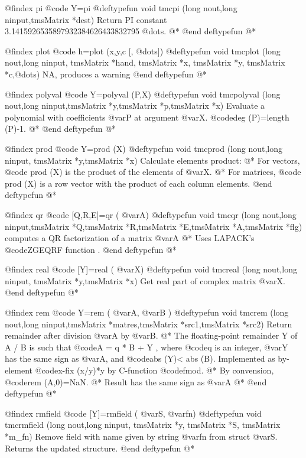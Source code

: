 @findex pi 
@code{   Y=pi    }
@deftypefun void tmcpi  (long nout,long ninput,tmsMatrix *dest)
Return PI constant 3.1415926535897932384626433832795 @dots{}. @*
@end deftypefun
@*


@findex  plot
@code{ h=plot (x,y,c [, @dots{}]) }
@deftypefun void tmcplot  (long nout,long ninput, tmsMatrix *hand, tmsMatrix *x, tmsMatrix *y, tmsMatrix *c,@dots{})
NA, produces a warning
@end deftypefun
@*


@findex polyval
@code{   Y=polyval (P,X)    }
@deftypefun void tmcpolyval (long nout,long ninput,tmsMatrix *y,tmsMatrix *p,tmsMatrix *x)
Evaluate a polynomial with coefficients @var{P} at argument @var{X}. @code{deg (P)=length (P)-1}. @*
@end deftypefun
@*



@findex prod
@code{   Y=prod (X)    }
@deftypefun void tmcprod (long nout,long ninput, tmsMatrix *y,tmsMatrix *x)
Calculate elements product: @*
For vectors, @code{ prod (X)} is the product of the elements of @var{X}. @*
For matrices, @code{ prod (X)} is a row vector with the product of each column elements.
@end deftypefun
@*


@findex   qr
@code{  [Q,R,E]=qr ( @var{A})}
@deftypefun void tmcqr  (long nout,long ninput,tmsMatrix *Q,tmsMatrix *R,tmsMatrix *E,tmsMatrix *A,tmsMatrix *flg)
computes a QR factorization of a    matrix     @var{A} @*
Uses LAPACK's @code{ZGEQRF}  function . 
@end deftypefun
@*


@findex  real
@code{  [Y]=real  ( @var{X})}
@deftypefun void tmcreal  (long nout,long ninput, tmsMatrix *y,tmsMatrix *x)
Get real part of complex matrix @var{X}. 
@end deftypefun
@*


@findex  rem
@code{ Y=rem  ( @var{A}, @var{B} ) }
@deftypefun void tmcrem (long nout,long ninput,tmsMatrix *matres,tmsMatrix *src1,tmsMatrix *src2)
Return remainder after division @var{A} by @var{B}. @*
The floating-point remainder Y of A / B is such that @code{A = q * B + Y} ,
where @code{q} is an integer, @var{Y} has the same sign as @var{A}, and   @code{abs (Y)< abs (B)}.
Implemented as by-element @code{x-fix (x/y)*y} by C-function @code{fmod}. @*
By convension, @code{rem (A,0)=NaN}. @*
Result has the same sign as @var{A} @*
@end deftypefun
@*


@findex  rmfield
@code{  [Y]=rmfield  ( @var{S}, @var{fn})}
@deftypefun void tmcrmfield  (long nout,long ninput, tmsMatrix *y, tmsMatrix *S, tmsMatrix *m_fn)
Remove field with name given by string @var{fn} from struct @var{S}. Returns the updated structure.
@end deftypefun
@*


